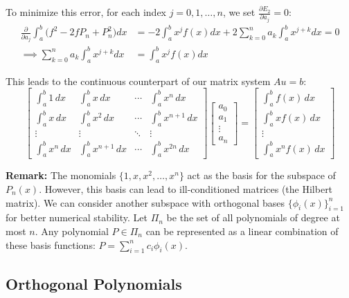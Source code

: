 \documentclass[12pt, a4paper]{article}
\theoremstyle{break}
\begin{document}
To minimize this error, for each index $j = 0, 1, \dots, n$, we set $\frac{\partial E_2}{\partial a_j} = 0$:
\begin{align*}
    \frac{\partial}{\partial a_j} \int_a^b \big(f^2 - 2f P_n + P_n^2\big) dx &= -2 \int_a^b x^j f(x) dx + 2 \sum_{k=0}^n a_k \int_a^b x^{j+k} dx = 0 \\
    \implies \sum_{k=0}^n a_k \int_a^b x^{j+k} dx &= \int_a^b x^j f(x) dx
\end{align*}

This leads to the continuous counterpart of our matrix system $A u = b$:
\begin{equation*}
    \begin{bmatrix} 
    \int_a^b 1 \,dx & \int_a^b x \,dx & \cdots & \int_a^b x^n \,dx \\ 
    \int_a^b x \,dx & \int_a^b x^2 \,dx & \cdots & \int_a^b x^{n+1} \,dx \\ 
    \vdots & \vdots & \ddots & \vdots \\ 
    \int_a^b x^n \,dx & \int_a^b x^{n+1} \,dx & \cdots & \int_a^b x^{2n} \,dx 
    \end{bmatrix} 
    \begin{bmatrix} a_0 \\ a_1 \\ \vdots \\ a_n \end{bmatrix} = 
    \begin{bmatrix} \int_a^b f(x) \,dx \\ \int_a^b x f(x) \,dx \\ \vdots \\ \int_a^b x^n f(x) \,dx \end{bmatrix}
\end{equation*}

\textbf{Remark:} The monomials $\{1, x, x^2, \dots, x^n\}$ act as the basis for the subspace of $P_n(x)$.
However, this basis can lead to ill-conditioned matrices (the Hilbert matrix).
We can consider another subspace with orthogonal bases $\{\phi_i(x)\}_{i=1}^n$ for better numerical stability.
Let $\Pi_n$ be the set of all polynomials of degree at most $n$.
Any polynomial $P \in \Pi_n$ can be represented as a linear combination of these basis functions: $P = \sum_{i=1}^n c_i \phi_i(x)$.
\subsection{Orthogonal Polynomials}
\end{document}
